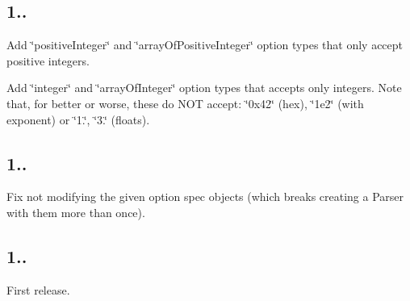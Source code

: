 \subsection*{1..}


\begin{DoxyItemize}
\item Add \char`\"{}positive\+Integer\char`\"{} and \char`\"{}array\+Of\+Positive\+Integer\char`\"{} option types that only accept positive integers.
\item Add \char`\"{}integer\char`\"{} and \char`\"{}array\+Of\+Integer\char`\"{} option types that accepts only integers. Note that, for better or worse, these do N\+OT accept\+: \char`\"{}0x42\char`\"{} (hex), \char`\"{}1e2\char`\"{} (with exponent) or \char`\"{}1.\char`\"{}, \char`\"{}3.\char`\"{} (floats).
\end{DoxyItemize}

\subsection*{1..}


\begin{DoxyItemize}
\item Fix not modifying the given option spec objects (which breaks creating a Parser with them more than once).
\end{DoxyItemize}

\subsection*{1..}

First release. 